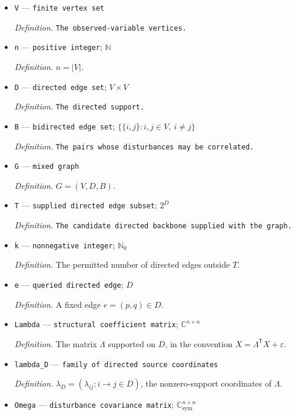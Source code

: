 \documentclass{article}
\begin{document}
\begin{itemize}
  \item \texttt{V} --- \texttt{finite vertex set}
  \par\smallskip\noindent\emph{Definition.} \texttt{The observed-\allowbreak{}variable vertices.}
  \item \texttt{n} --- \texttt{positive integer}; \(\mathbb N\)
  \par\smallskip\noindent\emph{Definition.} \(n=|V|\).
  \item \texttt{D} --- \texttt{directed edge set}; \(V\times V\)
  \par\smallskip\noindent\emph{Definition.} \texttt{The directed support.}
  \item \texttt{B} --- \texttt{bidirected edge set}; \(\{\{i,j\}:i,j\in V,\ i\ne j\}\)
  \par\smallskip\noindent\emph{Definition.} \texttt{The pairs whose disturbances may be correlated.}
  \item \texttt{G} --- \texttt{mixed graph}
  \par\smallskip\noindent\emph{Definition.} \(G=(V,D,B)\).
  \item \texttt{T} --- \texttt{supplied directed edge subset}; \(2^D\)
  \par\smallskip\noindent\emph{Definition.} \texttt{The candidate directed backbone supplied with the graph.}
  \item \texttt{k} --- \texttt{nonnegative integer}; \(\mathbb N_0\)
  \par\smallskip\noindent\emph{Definition.} The permitted number of directed edges outside \(T\).
  \item \texttt{e} --- \texttt{queried directed edge}; \(D\)
  \par\smallskip\noindent\emph{Definition.} A fixed edge \(e=(p,q)\in D\).
  \item \texttt{Lambda} --- \texttt{structural coefficient matrix}; \(\mathbb C^{n\times n}\)
  \par\smallskip\noindent\emph{Definition.} The matrix \(\Lambda\) supported on \(D\), in the convention \(X=\Lambda^{\mathsf T}X+\varepsilon\).
  \item \texttt{lambda\_\allowbreak{}D} --- \texttt{family of directed source coordinates}
  \par\smallskip\noindent\emph{Definition.} \(\lambda_D=(\lambda_{ij}:i\to j\in D)\), the nonzero-support coordinates of \(\Lambda\).
  \item \texttt{Omega} --- \texttt{disturbance covariance matrix}; \(\mathbb C^{n\times n}_{\mathrm{sym}}\)

\end{itemize}
\end{document}
